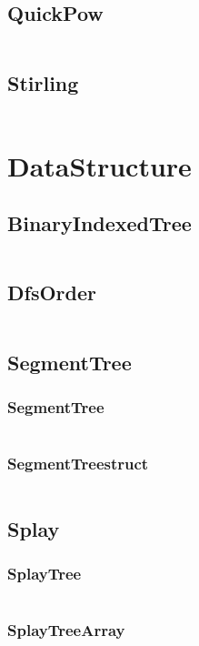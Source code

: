 \documentclass[a4paper,11pt]{article}
\begin{document}
\subsection{QuickPow}
\inputminted[breaklines]{c++}{02++Math/+QuickPow.cpp}
\subsection{Stirling}
\inputminted[breaklines]{c++}{02++Math/+Stirling.cpp}

\newpage
\section{DataStructure}
\subsection{BinaryIndexedTree}
\inputminted[breaklines]{c++}{03++DataStructure/+BinaryIndexedTree.cpp}
\subsection{DfsOrder}
\inputminted[breaklines]{c++}{03++DataStructure/+DfsOrder.cpp}
\subsection{SegmentTree}
\subsubsection{SegmentTree}
\inputminted[breaklines]{c++}{03++DataStructure/+SegmentTree/+SegmentTree.cpp}
\subsubsection{SegmentTreestruct}
\inputminted[breaklines]{c++}{03++DataStructure/+SegmentTree/+SegmentTreestruct.cpp}

\subsection{Splay}
\subsubsection{SplayTree}
\inputminted[breaklines]{c++}{03++DataStructure/+Splay/+SplayTree.cpp}
\subsubsection{SplayTreeArray}
\inputminted[breaklines]{c++}{03++DataStructure/+Splay/+SplayTreeArray.cpp}
\end{document}
